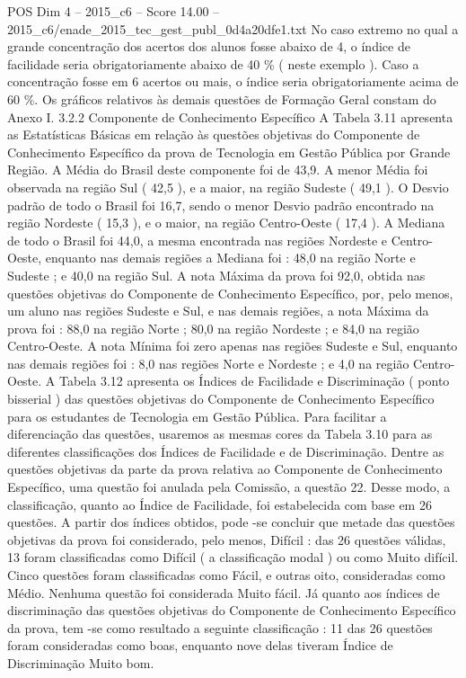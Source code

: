 \begin{textsample}{POS Dim 4 – 2015\_c6 – Score 14.00 – 2015\_c6/enade\_2015\_tec\_gest\_publ\_0d4a20dfe1.txt}
No caso extremo no qual a grande concentração dos acertos dos alunos fosse abaixo de 4, o índice de facilidade seria obrigatoriamente abaixo de 40 \% ( neste exemplo ).
Caso a concentração fosse em 6 acertos ou mais, o índice seria obrigatoriamente acima de 60 \%.
Os gráficos relativos às demais questões de Formação Geral constam do Anexo I. 3.2.2 Componente de Conhecimento Específico A Tabela 3.11 apresenta as Estatísticas Básicas em relação às questões objetivas do Componente de Conhecimento Específico da prova de Tecnologia em Gestão Pública por Grande Região.
A Média do Brasil deste componente foi de 43,9.
A menor Média foi observada na região Sul ( 42,5 ), e a maior, na região Sudeste ( 49,1 ).
O Desvio padrão de todo o Brasil foi 16,7, sendo o menor Desvio padrão encontrado na região Nordeste ( 15,3 ), e o maior, na região Centro-Oeste ( 17,4 ).
A Mediana de todo o Brasil foi 44,0, a mesma encontrada nas regiões Nordeste e Centro-Oeste, enquanto nas demais regiões a Mediana foi : 48,0 na região Norte e Sudeste ; e 40,0 na região Sul.
A nota Máxima da prova foi 92,0, obtida nas questões objetivas do Componente de Conhecimento Específico, por, pelo menos, um aluno nas regiões Sudeste e Sul, e nas demais regiões, a nota Máxima da prova foi : 88,0 na região Norte ; 80,0 na região Nordeste ; e 84,0 na região Centro-Oeste.
A nota Mínima foi zero apenas nas regiões Sudeste e Sul, enquanto nas demais regiões foi : 8,0 nas regiões Norte e Nordeste ; e 4,0 na região Centro-Oeste.
A Tabela 3.12 apresenta os Índices de Facilidade e Discriminação ( ponto bisserial ) das questões objetivas do Componente de Conhecimento Específico para os estudantes de Tecnologia em Gestão Pública.
Para facilitar a diferenciação das questões, usaremos as mesmas cores da Tabela 3.10 para as diferentes classificações dos Índices de Facilidade e de Discriminação.
Dentre as questões objetivas da parte da prova relativa ao Componente de Conhecimento Específico, uma questão foi anulada pela Comissão, a questão 22.
Desse modo, a classificação, quanto ao Índice de Facilidade, foi estabelecida com base em 26 questões.
A partir dos índices obtidos, pode -se concluir que metade das questões objetivas da prova foi considerado, pelo menos, Difícil : das 26 questões válidas, 13 foram classificadas como Difícil ( a classificação modal ) ou como Muito difícil.
Cinco questões foram classificadas como Fácil, e outras oito, consideradas como Médio.
Nenhuma questão foi considerada Muito fácil.
Já quanto aos índices de discriminação das questões objetivas do Componente de Conhecimento Específico da prova, tem -se como resultado a seguinte classificação : 11 das 26 questões foram consideradas como boas, enquanto nove delas tiveram Índice de Discriminação Muito bom.

\end{textsample}
